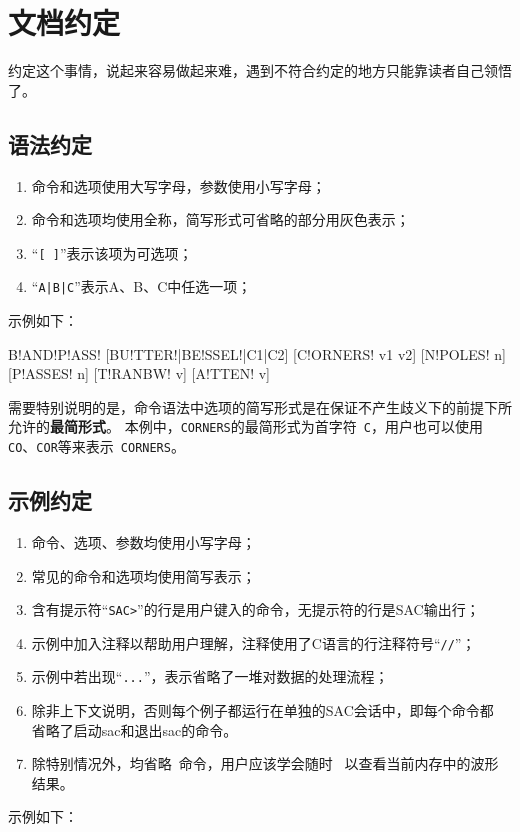 \section{文档约定}
约定这个事情，说起来容易做起来难，遇到不符合约定的地方只能靠读者自己领悟了。

\subsection*{语法约定}
\begin{enumerate}
\item 命令和选项使用大写字母，参数使用小写字母；
\item 命令和选项均使用全称，简写形式可省略的部分用灰色表示；
\item ``\verb+[ ]+''表示该项为可选项；
\item ``\verb+A|B|C+''表示A、B、C中任选一项；
\end{enumerate}

示例如下：
\begin{SACSTX}
B!AND!P!ASS! [BU!TTER!|BE!SSEL!|C1|C2] [C!ORNERS! v1 v2] [N!POLES! n] [P!ASSES! n]
    [T!RANBW! v] [A!TTEN! v]
\end{SACSTX}

需要特别说明的是，命令语法中选项的简写形式是在保证不产生歧义下的前提下所允许的\textbf{最简形式}。
本例中，\verb+CORNERS+的最简形式为首字符~\verb+C+，用户也可以使用
\verb+CO+、\verb+COR+等来表示~\verb+CORNERS+。

\subsection*{示例约定}
\begin{enumerate}
\item 命令、选项、参数均使用小写字母；
\item 常见的命令和选项均使用简写表示；
\item 含有提示符``\verb+SAC>+''的行是用户键入的命令，无提示符的行是SAC输出行；
\item 示例中加入注释以帮助用户理解，注释使用了C语言的行注释符号``\verb+//+''；
\item 示例中若出现``\verb+...+''，表示省略了一堆对数据的处理流程；
\item 除非上下文说明，否则每个例子都运行在单独的SAC会话中，即每个命令都
    省略了启动sac和退出sac的命令。
\item 除特别情况外，均省略~命令，用户应该学会随时~
    以查看当前内存中的波形结果。
\end{enumerate}

示例如下：
